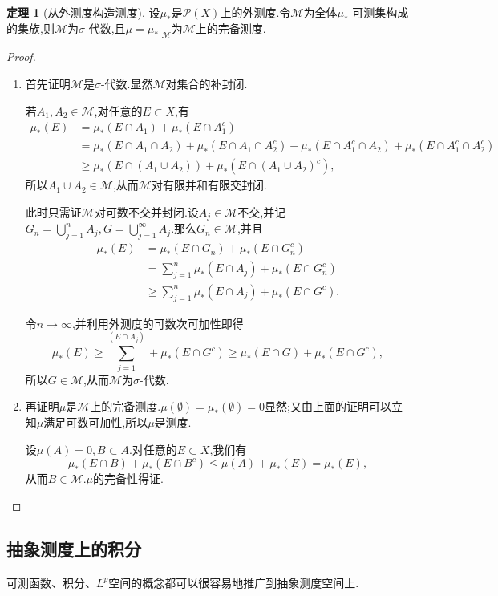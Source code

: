 \documentclass{ctexart}
\theoremstyle{definition}
\newtheorem{theorem}{定理}
\theoremstyle{remark}
\begin{document}
	\begin{theorem}[从外测度构造测度]
		设$\mu_*$是$\mathcal{P}(X)$上的外测度.令$\mathcal{M}$为全体$\mu_*$-可测集构成的集族,则$\mathcal{M}$为$\sigma$-代数,且$\mu=\mu_*|_\mathcal{M}$为$\mathcal{M}$上的完备测度.
	\end{theorem}
	\begin{proof}
		\begin{enumerate}
			\item 首先证明$\mathcal{M}$是$\sigma$-代数.显然$\mathcal{M}$对集合的补封闭.
			
			若$A_1,A_2\in\mathcal{M}$,对任意的$E\subset X$,有
			\begin{align*}
				\mu_*(E) & =\mu_*(E\cap A_1)+\mu_*(E\cap A_1^c) \\
				& =\mu_*(E\cap A_1\cap A_2)+\mu_*(E\cap A_1\cap A_2^c)+\mu_*(E\cap A_1^c\cap A_2)+\mu_*(E\cap A_1^c\cap A_2^c) \\
				& \ge\mu_*(E\cap(A_1\cup A_2))+\mu_*(E\cap(A_1\cup A_2)^c),
			\end{align*}
			所以$A_1\cup A_2\in\mathcal{M}$,从而$\mathcal{M}$对有限并和有限交封闭.
			
			此时只需证$\mathcal{M}$对可数不交并封闭.设$A_j\in\mathcal{M}$不交,并记$G_n=\bigcup_{j=1}^n{A_j},G=\bigcup_{j=1}^\infty{A_j}$.那么$G_n\in\mathcal{M}$,并且
			\begin{align*}
				\mu_*(E) & =\mu_*(E\cap G_n)+\mu_*(E\cap G_n^c) \\
				& =\sum_{j=1}^n{\mu_*(E\cap A_j)}+\mu_*(E\cap G_n^c) \\
				& \ge\sum_{j=1}^n{\mu_*(E\cap A_j)}+\mu_*(E\cap G^c).
			\end{align*}
			
			令$n\to\infty$,并利用外测度的可数次可加性即得
			$$\mu_*(E)\ge\sum_{j=1}^(E\cap A_j)+\mu_*(E\cap G^c)\ge\mu_*(E\cap G)+\mu_*(E\cap G^c),$$
			所以$G\in\mathcal{M}$,从而$\mathcal{M}$为$\sigma$-代数.
			
			\item 再证明$\mu$是$\mathcal{M}$上的完备测度.$\mu(\emptyset)=\mu_*(\emptyset)=0$显然;又由上面的证明可以立知$\mu$满足可数可加性,所以$\mu$是测度.
			
			设$\mu(A)=0,B\subset A$.对任意的$E\subset X$,我们有
			$$\mu_*(E\cap B)+\mu_*(E\cap B^c)\le\mu(A)+\mu_*(E)=\mu_*(E),$$
			从而$B\in\mathcal{M}$.$\mu$的完备性得证.
		\end{enumerate}
	\end{proof}
	
	\subsection{抽象测度上的积分}
	可测函数、积分、$L^p$空间的概念都可以很容易地推广到抽象测度空间上.
	
\end{document}
